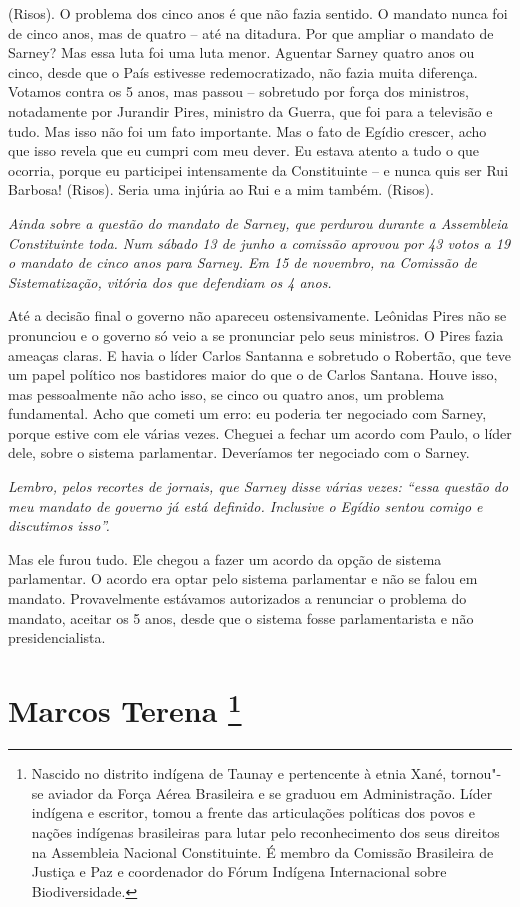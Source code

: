 (Risos). O problema dos cinco anos é que não fazia
sentido. O mandato nunca foi de cinco anos, mas de quatro -- até na
ditadura. Por que ampliar o mandato de Sarney? Mas essa luta foi uma
luta menor. Aguentar Sarney quatro anos ou cinco, desde que o País
estivesse redemocratizado, não fazia muita diferença. Votamos contra os
5 anos, mas passou -- sobretudo por força dos ministros, notadamente por
Jurandir Pires, ministro da Guerra, que foi para a televisão e tudo. Mas
isso não foi um fato importante. Mas o fato de Egídio crescer, acho que
isso revela que eu cumpri com meu dever. Eu estava atento a tudo o que
ocorria, porque eu participei intensamente da Constituinte -- e nunca
quis ser Rui Barbosa! (Risos). Seria uma injúria ao Rui e a mim também.
(Risos).

\medskip

\noindent\emph{Ainda sobre a questão do mandato de Sarney, que perdurou durante
a Assembleia Constituinte toda. Num sábado 13 de junho a comissão
aprovou por 43 votos a 19 o mandato de cinco anos para Sarney. Em 15 de
novembro, na Comissão de Sistematização, vitória dos que defendiam os 4
anos.}

Até a decisão final o governo não apareceu
ostensivamente. Leônidas Pires não se pronunciou e o governo só veio a
se pronunciar pelo seus ministros. O Pires fazia ameaças claras. E havia
o líder Carlos Santanna e sobretudo o Robertão, que teve um papel
político nos bastidores maior do que o de Carlos Santana. Houve isso,
mas pessoalmente não acho isso, se cinco ou quatro anos, um problema
fundamental. Acho que cometi um erro: eu poderia ter negociado com
Sarney, porque estive com ele várias vezes. Cheguei a fechar um acordo
com Paulo, o líder dele, sobre o sistema parlamentar. Deveríamos ter
negociado com o Sarney.

\medskip

\noindent\emph{Lembro, pelos recortes de jornais, que Sarney disse várias
vezes: ``essa questão do meu mandato de governo já está definido.
Inclusive o Egídio sentou comigo e discutimos isso''.}

Mas ele furou tudo. Ele chegou a fazer um acordo da
opção de sistema parlamentar. O acordo era optar pelo sistema
parlamentar e não se falou em mandato. Provavelmente estávamos
autorizados a renunciar o problema do mandato, aceitar os 5 anos, desde
que o sistema fosse parlamentarista e não presidencialista.

\chapter{Marcos Terena
\footnote{Nascido no distrito indígena de Taunay e pertencente à etnia Xané,
tornou"-se aviador da Força Aérea Brasileira e se graduou em
Administração. Líder indígena e escritor, tomou a frente das
articulações políticas dos povos e nações indígenas brasileiras para
lutar pelo reconhecimento dos seus direitos na Assembleia Nacional
Constituinte. É membro da Comissão Brasileira de Justiça e Paz e
coordenador do Fórum Indígena Internacional sobre Biodiversidade.}}

